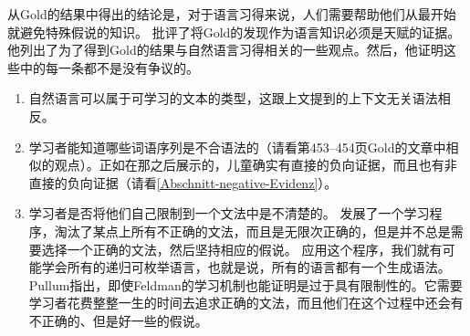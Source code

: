 从Gold的结果中得出的结论是，对于语言习得来说，人们需要帮助他们从最开始就避免特殊假说的知识。 批评了将Gold的发现作为语言知识必须是天赋的证据。他列出了为了得到Gold的结果与自然语言习得相关的一些观点。然后，他证明这些中的每一条都不是没有争议的。

\begin{enumerate}
\item 自然语言可以属于可学习的文本的类型，这跟上文提到的上下文无关语法相反。

\item 学习者能知道哪些词语序列是不合语法的（请看第453--454页Gold的文章中相似的观点）。正如在那之后展示的，儿童确实有直接的负向证据，而且也有非直接的负向证据（请看\ref{Abschnitt-negative-Evidenz}）。

\item 学习者是否将他们自己限制到一个文法中是不清楚的。 \citet{Feldman72a}发展了一个学习程序，淘汰了某点上所有不正确的文法，而且是无限次正确的，但是并不总是需要选择一个正确的文法，然后坚持相应的假说。
  应用这个程序，我们就有可能学会所有的递归可枚举语言，也就是说，所有的语言都有一个生成语法。Pullum指出，即使Feldman的学习机制也能证明是过于具有限制性的。它需要学习者花费整整一生的时间去追求正确的文法，而且他们在这个过程中还会有不正确的、但是好一些的假说。


\end{enumerate}
